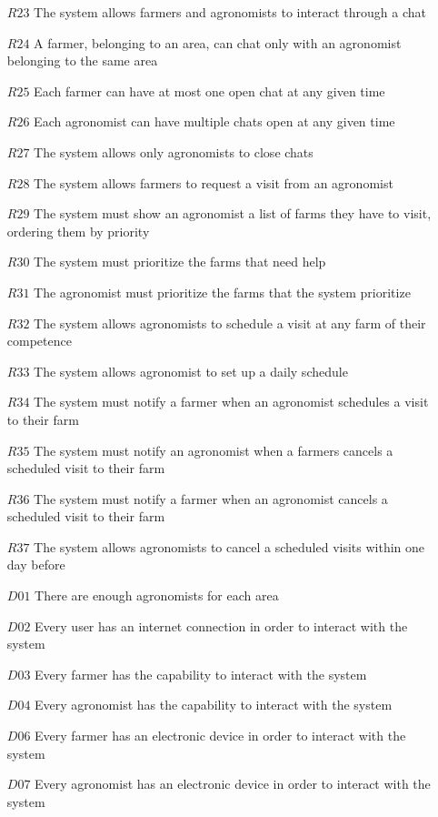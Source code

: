 \documentclass[10pt]{report}
\begin{document}
\begin{itemize}
    \item [$R23$] The system allows farmers and agronomists to interact through a chat
    \item [$R24$] A farmer, belonging to an area, can chat only with an agronomist belonging to the same area
    \item [$R25$] Each farmer can have at most one open chat at any given time
    \item [$R26$] Each agronomist can have multiple chats open at any given time
    \item [$R27$] The system allows only agronomists to close chats
    \item [$R28$] The system allows farmers to request a visit from an agronomist
    \item [$R29$] The system must show an agronomist a list of farms they have to visit, ordering them by priority
    \item [$R30$] The system must prioritize the farms that need help
    \item [$R31$] The agronomist must prioritize the farms that the system prioritize
    \item [$R32$] The system allows agronomists to schedule a visit at any farm of their competence
    \item [$R33$] The system allows agronomist to set up a daily schedule
    \item [$R34$] The system must notify a farmer when an agronomist schedules a visit to their farm
    \item [$R35$] The system must notify an agronomist when a farmers cancels a scheduled visit to their farm
    \item [$R36$] The system must notify a farmer when an agronomist cancels a scheduled visit to their farm
    \item [$R37$] The system allows agronomists to cancel a scheduled visits within one day before
    \item [$D01$] There are enough agronomists for each area
    \item [$D02$] Every user has an internet connection in order to interact with the system
    \item [$D03$] Every farmer has the capability to interact with the system
    \item [$D04$] Every agronomist has the capability to interact with the system
    \item [$D06$] Every farmer has an electronic device in order to interact with the system
    \item [$D07$] Every agronomist has an electronic device in order to interact with the system

\end{itemize}
\end{document}
